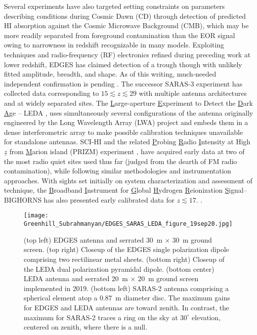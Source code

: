 Several experiments have also targeted setting constraints on parameters describing conditions during Cosmic Dawn (CD) through detection of predicted HI absorption against the Cosmic Microwave Background (CMB), which may be more readily separated from foreground contamination than the EOR signal owing to narrowness in redshift recognizable in many models.  Exploiting techniques and radio-frequency (RF) electronics refined during  preceding work at lower redshift, EDGES has claimed detection of a trough \cite{bowman18} though with unlikely fitted amplitude, breadth, and shape.  As of this writing, much-needed independent confirmation is pending \cite{greenhill18,hills18,bradley19,spinelli19}.  The successor SARAS-3 experiment has collected data corresponding to $15\lesssim z \lesssim 29$ with multiple antenna architectures and at widely separated sites.  The {\underline L}arge-aperture {\underline E}xperiment to Detect the {\underline D}ark {\underline A}ge -- LEDA \cite{greenhill12,price18}, uses simultaneously several configurations of the antenna originally engineered by the Long Wavelength Array (LWA) project \cite{taylor12} and embeds them in a dense interferometric array to make possible calibration techniques unavailable for standalone antennas.  SCI-HI \cite{voytek14} and  the related {\underline P}robing {\underline R}adio {\underline I}ntensity at High ${\underline z}$ from {\underline M}arion island (PRIZM) experiment \cite{philip19}, have acquired early data at two of the most radio quiet sites used thus far (judged from the dearth of FM radio contamination), while following similar methodologies and instrumentation approaches.  With sights set initially on system characterization and assessment of technique, the {\underline B}roadband {\underline I}nstrument for {\underline G}lobal {\underline H}ydrogen {\underline R}eionization {\underline S}ignal--BIGHORNS has also presented  early calibrated data for $z\lesssim 17$. \cite{sokolowski15}. 


\begin{figure}[htb]
\begin{center}
\hspace*{-0.15in}\texttt{[image: Greenhill\_Subrahmanyan/EDGES\_SARAS\_LEDA\_figure\_19sep20.jpg]}
\end{center}
\caption{(top left) EDGES antenna and serrated 30~m $\times$ 30~m ground screen.  (top right) Closeup of the EDGES single polarization dipole comprising two rectilinear metal sheets.  (bottom right) Closeup of the LEDA dual polarization pyramidal dipole.  (bottom center) LEDA antenna and serrated 20~m $\times$ 20~m ground screen implemented in 2019. (bottom left) SARAS-2 antenna comprising a spherical element atop a 0.87~m diameter disc.  The maximum gains for EDGES and LEDA antennas are toward zenith.  In contrast, the maximum for SARAS-2 traces a ring on the sky at $30^\circ$ elevation, centered on zenith, where there is a null.}
\end{figure}

